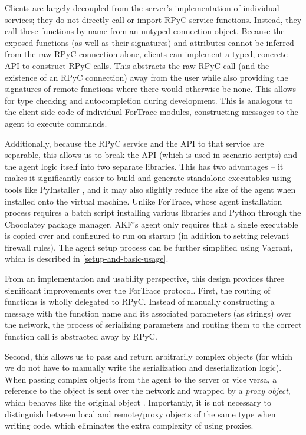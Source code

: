 \documentclass[letterpaper,12pt]{report}
\begin{document}
Clients are largely decoupled from the server's implementation of
individual services; they do not directly call or import RPyC service
functions. Instead, they call these functions by name from an untyped
connection object. Because the exposed functions (as well as their
signatures) and attributes cannot be inferred from the raw RPyC
connection alone, clients can implement a typed, concrete API to
construct RPyC calls. This abstracts the raw RPyC call (and the
existence of an RPyC connection) away from the user while also providing
the signatures of remote functions where there would otherwise be none.
This allows for type checking and autocompletion during development.
This is analogous to the client-side code of individual ForTrace
modules, constructing messages to the agent to execute commands.

Additionally, because the RPyC service and the API to that service are
separable, this allows us to break the API (which is used in scenario
scripts) and the agent logic itself into two separate libraries. This
has two advantages -- it makes it significantly easier to build and
generate standalone executables using tools like PyInstaller
\cite{PyinstallerPyinstaller2025}, and it may also slightly reduce
the size of the agent when installed onto the virtual machine. Unlike
ForTrace, whose agent installation process requires a batch script
installing various libraries and Python through the Chocolatey package
manager, AKF's agent only requires that a single executable is copied
over and configured to run on startup (in addition to setting relevant
firewall rules). The agent setup process can be further simplified using
Vagrant, which is described in \autoref{setup-and-basic-usage}.

From an implementation and usability perspective, this design provides
three significant improvements over the ForTrace protocol. First, the
routing of functions is wholly delegated to RPyC. Instead of manually
constructing a message with the function name and its associated
parameters (as strings) over the network, the process of serializing
parameters and routing them to the correct function call is abstracted
away by RPyC.

Second, this allows us to pass and return arbitrarily complex objects
(for which we do not have to manually write the serialization and
deserialization logic). When passing complex objects from the agent to
the server or vice versa, a reference to the object is sent over the
network and wrapped by a \emph{proxy object}, which behaves like the
original object \cite{TheoryOperationRPyC}. Importantly, it is not
necessary to distinguish between local and remote/proxy objects of the
same type when writing code, which eliminates the extra complexity of
using proxies.
\end{document}
